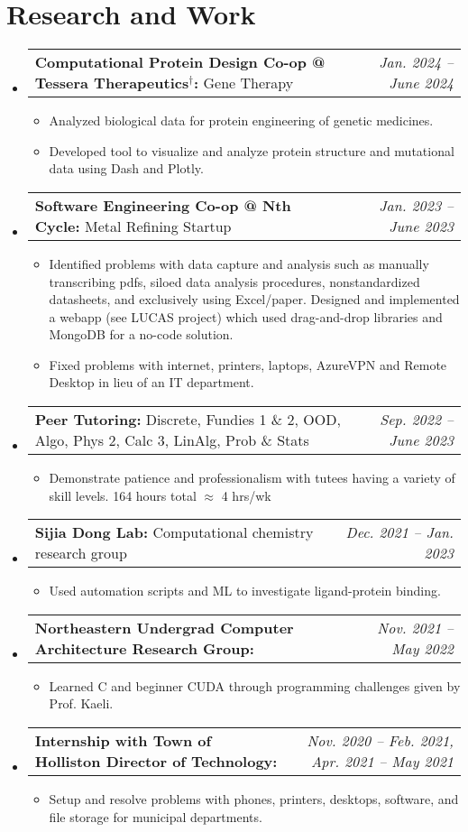 \documentclass[letterpaper,11pt]{article}
\makeatletter
\newcommand{\resumeBullet}[1]{
  \item\small{
    #1 \vspace{-2pt}
  }
}
\newcommand{\resumeSubheadingThin}[3]{
  \vspace{-1pt}\item
    \begin{tabular*}{0.97\textwidth}[t]{l@{\extracolsep{\fill}}r}
      \small\textbf{#1:} #3 & \small\textit{#2} 
    \end{tabular*}\vspace{-7pt}
}
\newcommand{\resumeSubHeadingListStart}{\begin{itemize}[leftmargin=*]}
\newcommand{\resumeSubHeadingListEnd}{\end{itemize}}
\newcommand{\resumeItemListStart}{\begin{itemize}}
\newcommand{\resumeItemListEnd}{\end{itemize}\vspace{-5pt}}
\makeatother
\begin{document}
  \section{Research and Work \small{}}
  \resumeSubHeadingListStart
  \resumeSubheadingThin{Computational Protein Design Co-op @ Tessera Therapeutics$^\dag$}{Jan. 2024 -- June 2024}{Gene Therapy}
  \resumeItemListStart
  \resumeBullet{Analyzed biological data for protein engineering of genetic medicines.}
  \resumeBullet{Developed tool to visualize and analyze protein structure and mutational data using Dash and Plotly.}
  \resumeItemListEnd
  \resumeSubheadingThin{Software Engineering Co-op @ Nth Cycle}{Jan. 2023 -- June 2023}{Metal Refining Startup}
  \resumeItemListStart
  \resumeBullet{Identified problems with data capture and analysis such as manually transcribing pdfs, siloed data analysis procedures, nonstandardized datasheets, and exclusively using Excel/paper. Designed and implemented a webapp (see LUCAS project) which used drag-and-drop libraries and MongoDB for a no-code solution. }
  \resumeBullet{Fixed problems with internet, printers, laptops, AzureVPN and Remote Desktop in lieu of an IT department.}
  \resumeItemListEnd
  \resumeSubheadingThin{Peer Tutoring\normalfont{*}}{Sep. 2022 -- June 2023}{Discrete, Fundies 1 \& 2, OOD, Algo, Phys 2, Calc 3, LinAlg, Prob \& Stats}
  \resumeItemListStart
    \resumeBullet{Demonstrate patience and professionalism with tutees having a variety of skill levels. 164 hours total $\approx$ 4 hrs/wk}
  \resumeItemListEnd
  \resumeSubheadingThin{Sijia Dong Lab\normalfont{*}}{Dec. 2021 -- Jan. 2023}{Computational
  chemistry research group} \resumeItemListStart \resumeBullet{Used automation scripts and ML to investigate ligand-protein binding.}
\resumeItemListEnd
  \resumeSubheadingThin{Northeastern Undergrad Computer Architecture Research Group\normalfont{*}}{Nov. 2021 -- May 2022}{} \resumeItemListStart \resumeBullet{Learned C and beginner CUDA through programming challenges given by Prof. Kaeli.}
  \resumeItemListEnd
  \resumeSubheadingThin{Internship with Town of Holliston Director of Technology\normalfont{*}}{Nov. 2020 -- Feb. 2021, Apr. 2021 -- May 2021}{}
  \resumeItemListStart
    \resumeBullet{Setup and resolve problems with phones, printers, desktops, software, and file storage for municipal departments.}
  \resumeItemListEnd \resumeSubHeadingListEnd
\end{document}
